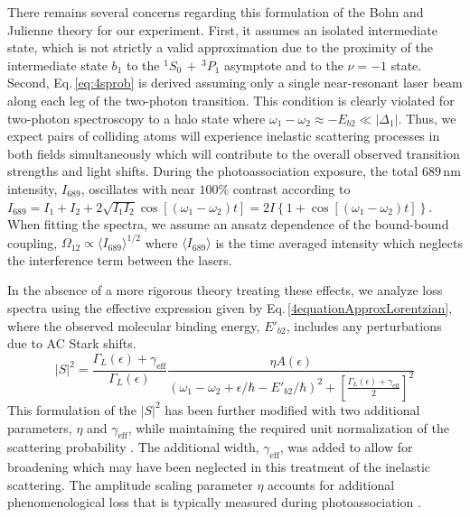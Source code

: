 There remains several concerns regarding this formulation of the Bohn and Julienne theory for our experiment.
First, it assumes an isolated intermediate state, which is not strictly a valid approximation due to the proximity of the intermediate state $b_1$ to the $^1S_0\,+\,^3P_1$ asymptote and to the $\nu = -1$ state.
Second, Eq.\,\ref{eq:4sprob} is derived assuming only a single near-resonant laser beam along each leg of the two-photon transition.
This condition is clearly violated for two-photon spectroscopy to a halo state where $\omega_1 - \omega_2 \approx -E_{b2} \ll |\Delta_1|$.
Thus, we expect pairs of colliding atoms will experience inelastic scattering processes in both fields simultaneously which will contribute to the overall observed transition strengths and light shifts.
During the photoassociation exposure, the total $689\,\text{nm}$ intensity, $I_{\text{689}}$, oscillates with near $100$\% contrast according to $I_{\text{689}}=I_1+I_2+2\sqrt{I_1I_2}\cos \left[(\omega_1-\omega_2)t \right]=2I\left\{1+\cos \left[(\omega_1-\omega_2)t \right]\right\}$.
When fitting the spectra, we assume an ansatz dependence of the bound-bound coupling, $\Omega_{12} \propto \langle I_{689} \rangle^{1/2}$ where $\langle I_{689} \rangle$ is the time averaged intensity which neglects the interference term between the lasers.

In the absence of a more rigorous theory treating these effects, we analyze loss spectra using the effective expression given by Eq.\,\ref{4equationApproxLorentzian}, where the observed molecular binding energy, $E'_{b2}$, includes any perturbations due to AC Stark shifts.
\begin{equation}\label{4equationApproxLorentzian}
  \vert S \vert^2 = \frac{\Gamma_L(\epsilon)+\gamma_{\text{eff}}}{\Gamma_L(\epsilon)} \frac{\eta  A(\epsilon)} {\left(\omega_1-\omega_2+\epsilon/\hbar-E'_{b2}/\hbar\right)^2+\left[
  	\frac{\Gamma_L(\epsilon)+\gamma_{\text{eff}}}{2}\right]^2}
\end{equation}
This formulation of the $\vert S \vert^2$ has been further modified with two additional parameters, $\eta$ and $\gamma_{\text{eff}}$, while maintaining the required unit normalization of the scattering probability \cite{Quemener2012,Krems2009a}.
The additional width, $\gamma_{\text{eff}}$, was added to allow for broadening which may have been neglected in this treatment of the inelastic scattering.
The amplitude scaling parameter $\eta$ accounts for additional phenomenological loss that is typically measured during photoassociation \cite{Zelevinsky2006,Borkowski2014a,Kim2016,Nicholson2015a,Yan2013c,Theis2004,Blatt}.


